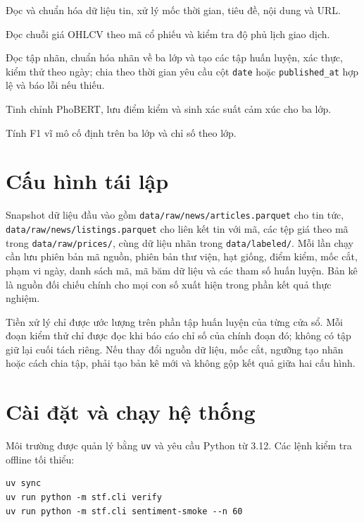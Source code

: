 \begin{description}[style=nextline, nosep]
  \item[\texttt{stf.data.news}] Đọc và chuẩn hóa dữ liệu tin, xử lý mốc thời gian, tiêu đề,
  nội dung và URL.
  \item[\texttt{stf.data.prices}] Đọc chuỗi giá OHLCV theo mã cổ phiếu và kiểm tra độ
  phủ lịch giao dịch.
  \item[\texttt{stf.sentiment.dataset}] Đọc tập nhãn, chuẩn hóa nhãn về ba lớp và tạo
  các tập huấn luyện, xác thực, kiểm thử theo ngày; chia theo thời gian yêu cầu cột
  \texttt{date} hoặc \texttt{published\_at} hợp lệ và báo lỗi nếu thiếu.
  \item[\texttt{stf.sentiment.model}] Tinh chỉnh PhoBERT, lưu điểm kiểm và sinh xác
  suất cảm xúc cho ba lớp.
  \item[\texttt{stf.sentiment.metrics}] Tính F1 vĩ mô cố định trên ba lớp và chỉ số theo lớp.
\end{description}

\section{Cấu hình tái lập}

Snapshot dữ liệu đầu vào gồm \texttt{data/raw/news/articles.parquet} cho tin tức,
\texttt{data/raw/news/listings.parquet} cho liên kết tin với mã, các tệp giá theo mã
trong \texttt{data/raw/prices/}, cùng dữ liệu nhãn trong \texttt{data/labeled/}.
Mỗi lần chạy cần lưu phiên bản mã nguồn, phiên bản thư viện, hạt giống, điểm kiểm, mốc cắt,
phạm vi ngày, danh sách mã, mã băm dữ liệu và các tham số huấn luyện. Bản kê là nguồn
đối chiếu chính cho mọi con số xuất hiện trong phần kết quả thực nghiệm.

Tiền xử lý chỉ được ước lượng trên phần tập huấn luyện của từng cửa sổ. Mỗi đoạn kiểm thử
chỉ được đọc khi báo cáo chỉ số của chính đoạn đó; không có tập giữ lại cuối tách riêng. Nếu
thay đổi nguồn dữ liệu, mốc cắt, ngưỡng tạo nhãn hoặc cách chia tập, phải tạo bản kê mới và
không gộp kết quả giữa hai cấu hình.

\section{Cài đặt và chạy hệ thống}

Môi trường được quản lý bằng \texttt{uv} và yêu cầu Python từ 3.12. Các lệnh kiểm tra
offline tối thiểu:

\begin{verbatim}
uv sync
uv run python -m stf.cli verify
uv run python -m stf.cli sentiment-smoke --n 60
\end{verbatim}

